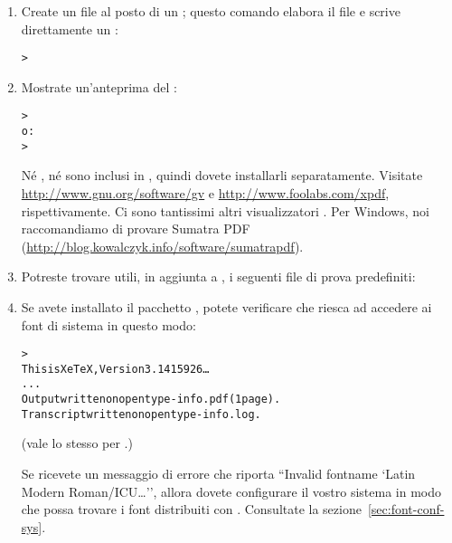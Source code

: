 \documentclass{article}
\begin{document}
\begin{enumerate}
\item Create un file  al posto di un \dvi{}; questo comando
elabora il file  e scrive direttamente un :
\begin{alltt}
> 
\end{alltt}

\item Mostrate un'anteprima del :
\begin{alltt}
> 
\textrm{o:}
> 
\end{alltt}
Né , né  sono inclusi in \TL{}, quindi dovete
installarli separatamente. Visitate \url{http://www.gnu.org/software/gv} e
\url{http://www.foolabs.com/xpdf}, rispettivamente. Ci sono tantissimi
altri visualizzatori . Per Windows, noi raccomandiamo di provare
Sumatra PDF (\url{http://blog.kowalczyk.info/software/sumatrapdf}).

\item Potreste trovare utili, in aggiunta a , i
seguenti file di prova predefiniti:


\item Se avete installato il pacchetto , potete verificare che
riesca ad accedere ai font di sistema in questo modo:
\begin{alltt}
> 
This is XeTeX, Version 3.1415926\dots
...
Output written on opentype-info.pdf (1 page).
Transcript written on opentype-info.log.
\end{alltt}
(vale lo stesso per .)

Se ricevete un messaggio di errore che riporta ``Invalid fontname `Latin
Modern Roman/ICU\dots'', allora dovete configurare il vostro sistema in
modo che \XeTeX{} possa trovare i font distribuiti con \TL. Consultate la
sezione~\ref{sec:font-conf-sys}.

\end{enumerate}
\end{document}
